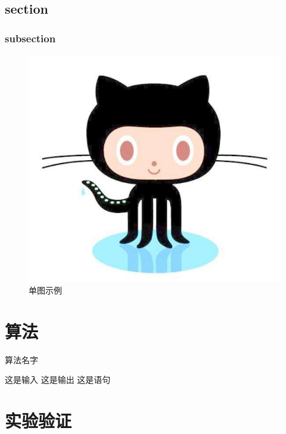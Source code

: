 \documentclass[winfonts,bachelor,twoside]{njuthesis}
\begin{document}
\lipsum[1]

\section{section}\label{sec:rate}
\lipsum[1]
\subsection{subsection}
\lipsum[1]

\begin{figure}[htbp]
  \centering
  \includegraphics[width=0.6\linewidth]{./figure/github.jpg}
  \caption{单图示例}
  \label{fig:system}
\end{figure}

\chapter{算法}

\begin{algorithm}[htbp]
  \caption{算法名字}
  \label{alg:alg1}
  \begin{algorithmic}[1]
        \REQUIRE 这是输入
        \ENSURE 这是输出
		      \STATE 这是语句
        \ENDWHILE
  \end{algorithmic}
\end{algorithm}

\chapter{实验验证}
\end{document}
